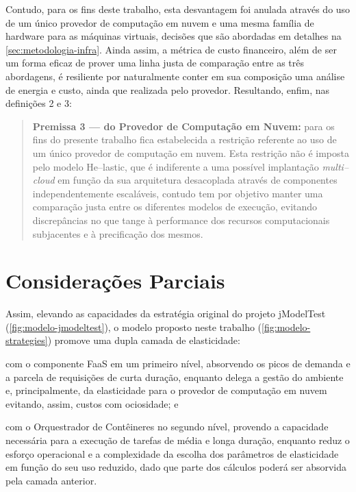 \documentclass[english,brazilian]{UNISINOSmonografia} %
\begin{document}
Contudo, para os fins deste trabalho, esta desvantagem foi anulada através do uso de um único provedor de computação em nuvem e uma mesma família de hardware para as máquinas virtuais, decisões que são abordadas em detalhes na \autoref{sec:metodologia-infra}.
Ainda assim, a métrica de custo financeiro, além de ser um forma eficaz de prover uma linha justa de comparação entre as três abordagens, é resiliente por naturalmente conter em sua composição uma análise de energia e custo, ainda que realizada pelo provedor.
Resultando, enfim, nas definições 2 e 3:
\begin{quote}
	\textbf{Premissa 3 --- do Provedor de Computação em Nuvem:} para os fins do presente trabalho fica estabelecida a restrição referente ao uso de um único provedor de computação em nuvem. Esta restrição não é imposta pelo modelo \textsf{He}--lastic, que é indiferente a uma possível implantação \textit{multi--cloud} em função da sua arquitetura desacoplada através de componentes independentemente escaláveis, contudo tem por objetivo manter uma comparação justa entre os diferentes modelos de execução, evitando discrepâncias no que tange à performance dos recursos computacionais subjacentes e à precificação dos mesmos.
\end{quote}


\section{Considerações Parciais}


Assim, elevando as capacidades da estratégia original do projeto jModelTest (\autoref{fig:modelo-jmodeltest}), o modelo proposto neste trabalho (\autoref{fig:modelo-strategies}) promove uma dupla camada de elasticidade:
\begin{inparaenum}[(i)]
	\item com o componente FaaS em um primeiro nível, absorvendo os picos de demanda e a parcela de requisições de curta duração, enquanto delega a gestão do ambiente e, principalmente, da elasticidade para o provedor de computação em nuvem evitando, assim, custos com ociosidade; e
	\item com o Orquestrador de Contêineres no segundo nível, provendo a capacidade necessária para a execução de tarefas de média e longa duração, enquanto reduz o esforço operacional e a complexidade da escolha dos parâmetros de elasticidade em função do seu uso reduzido, dado que parte dos cálculos poderá ser absorvida pela camada anterior.
\end{inparaenum}
\end{document}
